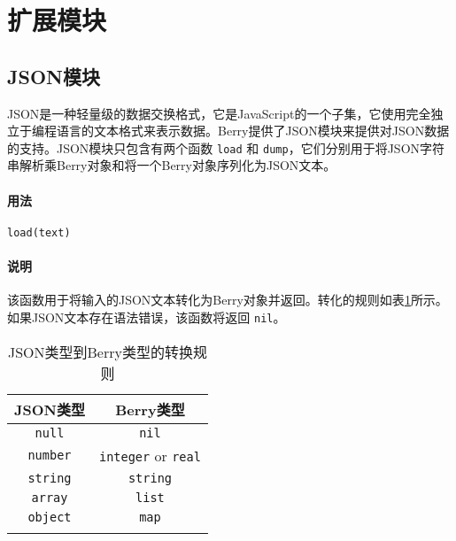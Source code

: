 \section{扩展模块}
\subsection{JSON模块}

JSON是一种轻量级的数据交换格式，它是JavaScript的一个子集，它使用完全独立于编程语言的文本格式来表示数据。Berry提供了JSON模块来提供对JSON数据的支持。JSON模块只包含有两个函数 \texttt{load} 和 \texttt{dump}，它们分别用于将JSON字符串解析乘Berry对象和将一个Berry对象序列化为JSON文本。


\paragraph{用法}
\begin{lstlisting}[language=berry, numbers=none]
load(text)
\end{lstlisting}

\paragraph{说明}
该函数用于将输入的JSON文本转化为Berry对象并返回。转化的规则如表\ref{tab::json2berry_rule}所示。如果JSON文本存在语法错误，该函数将返回 \texttt{nil}。
\begin{table}[htb]
    \centering
    \setlength{\tabcolsep}{18mm}
    \begin{tabular}{cc} \Xhline{1pt}
        \textbf{JSON类型} & \textbf{Berry类型} \\ \hline
        \texttt{null} & \texttt{nil} \\
        \texttt{number} & \texttt{integer} or \texttt{real} \\
        \texttt{string} & \texttt{string} \\
        \texttt{array} & \texttt{list} \\
        \texttt{object} & \texttt{map} \\
        \Xhline{1pt}
    \end{tabular}
    \caption{JSON类型到Berry类型的转换规则}
    \label{tab::json2berry_rule}
\end{table}

